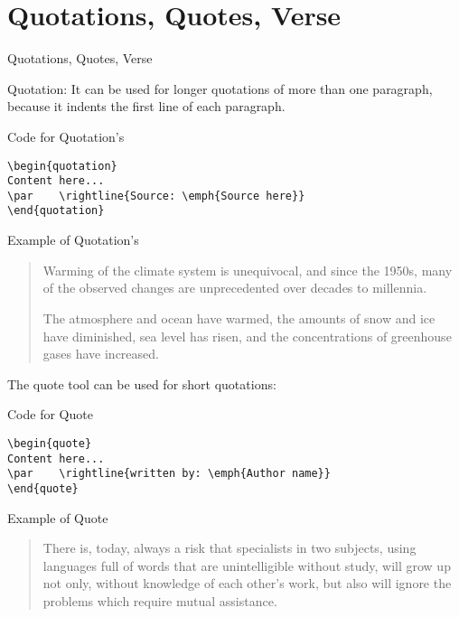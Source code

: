 \documentclass[10pt,xcolor=x11names]{beamer}
\begin{document}
\section{Quotations, Quotes, Verse}
\begin{frame}{Quotations, Quotes, Verse}  

\alert{Quotation}: It can be used for longer quotations of more than one paragraph, because it indents the first line of each paragraph. 

{\footnotesize 
\begin{exampleblock}{Code for Quotation's}	
\begin{verbatim}
\begin{quotation}
Content here...
\par 	\rightline{Source: \emph{Source here}} 
\end{quotation}
\end{verbatim}
\end{exampleblock}

\begin{exampleblock}{Example  of Quotation's}
		
\begin{quotation}	
Warming of the climate system is unequivocal, and since the 1950s, many of the observed changes are unprecedented over decades to millennia.

The atmosphere and ocean have warmed, the amounts of snow and ice have diminished, sea level has risen, and the concentrations of greenhouse gases have increased.
	\par 	{} 
	\end{quotation}
\end{exampleblock}
}

The \alert{quote}  tool can be used for short quotations:

\begin{exampleblock}{Code for Quote}	
\begin{verbatim}
\begin{quote}
Content here... 
\par 	\rightline{written by: \emph{Author name}} 
\end{quote}
\end{verbatim}
\end{exampleblock}

\begin{exampleblock}{Example of Quote}	
	\begin{quote}
There is, today, always a risk that specialists in two subjects, using languages full of words that are unintelligible without study, will grow up not only, without
knowledge of each other’s work, but also will ignore the
problems which require mutual assistance.
		\par 	{} 
	\end{quote}
\end{exampleblock}


\end{frame}
\end{document}
